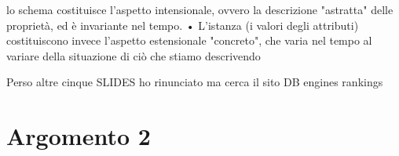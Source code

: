 lo schema costituisce l'aspetto intensionale,
ovvero la descrizione "astratta" delle
proprietà, ed è invariante nel tempo.
• L'istanza (i valori degli attributi) costituiscono
invece l'aspetto estensionale "concreto", che
varia nel tempo al variare della situazione di
ciò che stiamo descrivendo

Perso altre cinque SLIDES
ho rinunciato
ma cerca il sito DB engines rankings


\chapter{Argomento 2}

